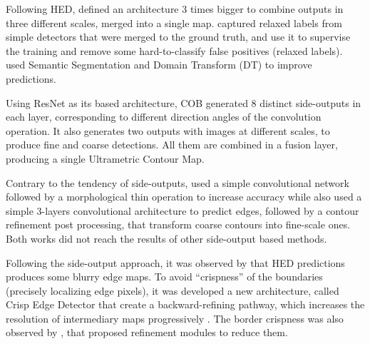 
Following HED, \cite{Kokkinos:2016} defined an architecture 3 times bigger to combine outputs in three different scales, merged into a single map.
\cite{LearningRelaxed:2016:7780401} captured relaxed labels from simple detectors that were merged to the ground truth, and use it to supervise the training and remove some hard-to-classify false positives (relaxed labels).
\cite{SemanticSeg:2016:7780861} used Semantic Segmentation and Domain Transform (DT) to improve predictions.

Using ResNet \cite{RESNET:2016:7780459} as its based architecture, COB \cite{COB:2018:7917294} generated 8 distinct side-outputs in each layer, corresponding to different direction angles of the convolution operation.
It also generates two outputs with images at different scales, to produce fine and coarse detections.
All them are combined in a fusion layer, producing a single Ultrametric Contour Map. %

Contrary to the tendency of side-outputs, \cite{EdgeCNN:Wang201612} used a simple convolutional network followed by a morphological thin operation to increase accuracy while \cite{ContourDetect:2017:8124495} also used a simple 3-layers convolutional architecture to predict edges, followed by a contour refinement post processing, that transform coarse contours into fine-scale ones.
Both works did not reach the results of other side-output based methods. %

Following the side-output approach, it was observed by \cite{Wang:2017} that HED predictions produces some blurry edge maps.
To avoid ``crispness'' of the boundaries (precisely localizing edge pixels), it was developed a new architecture, called Crisp Edge Detector that create a backward-refining pathway, which increases the resolution of intermediary maps progressively \cite{Wang:2017}. 
The border crispness was also observed by \cite{CrispBoundaries:2018:Deng2018570}, that proposed refinement modules to reduce them.

